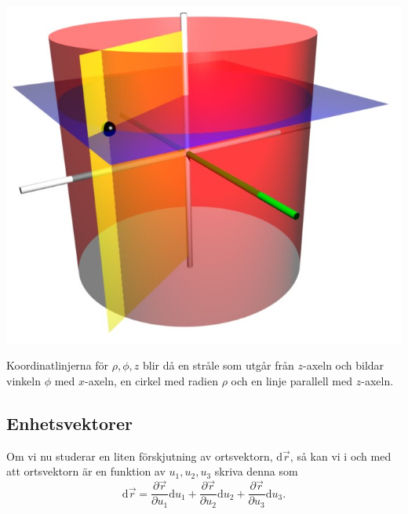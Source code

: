 \documentclass[%
oneside,                 %
final,                   %
10pt]{article}
\newenvironment{notice_mdfboxadmon}[1][]{
\begin{notice_mdfboxmdframed}[frametitle=#1]
}
{
\end{notice_mdfboxmdframed}
}
\begin{document}
\begin{notice_mdfboxadmon}
\vspace{6mm}

\centerline{\includegraphics[width=0.8\linewidth]{fig/Cylindrical_coordinate_surfaces.png}}

\vspace{6mm}



Koordinatlinjerna för $\rho, \phi, z$ blir då en stråle som utgår från $z$-axeln och bildar vinkeln $\phi$ med $x$-axeln, en cirkel med radien $\rho$ och en linje parallell med $z$-axeln.
\end{notice_mdfboxadmon} %



\subsection*{Enhetsvektorer}
Om vi nu studerar en liten förskjutning av ortsvektorn, $\mbox{d}\vec{r}$, så kan vi i och med att ortsvektorn är en funktion av $u_1, u_2, u_3$ skriva denna som 
\begin{equation}
  \mbox{d}\vec{r} = \frac{\partial \vec{r}}{\partial u_1} \mbox{d}u_1 +
\frac{\partial \vec{r}}{\partial u_2} \mbox{d}u_2 + 
\frac{\partial \vec{r}}{\partial u_3} \mbox{d}u_3.
\label{eq:forskjutningsvektor}
\end{equation}
\end{document}
